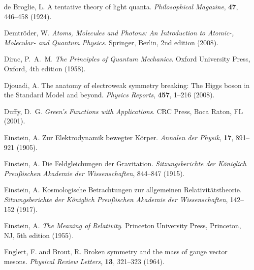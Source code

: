 \documentclass[12pt,a4paper]{article}
\begin{document}
\begin{thebibliography}{99}
		de Broglie, L.
		\newblock A tentative theory of light quanta.
		\newblock \textit{Philosophical Magazine}, \textbf{47}, 446--458 (1924).
		\newblock {}
		
		Demtröder, W.
		\newblock \textit{Atoms, Molecules and Photons: An Introduction to Atomic-, Molecular- and Quantum Physics}.
		\newblock Springer, Berlin, 2nd edition (2008).
		
		Dirac, P.~A.~M.
		\newblock \textit{The Principles of Quantum Mechanics}.
		\newblock Oxford University Press, Oxford, 4th edition (1958).
		
		Djouadi, A.
		\newblock The anatomy of electroweak symmetry breaking: The Higgs boson in the Standard Model and beyond.
		\newblock \textit{Physics Reports}, \textbf{457}, 1--216 (2008).
		\newblock {}
		
		Duffy, D.~G.
		\newblock \textit{Green's Functions with Applications}.
		\newblock CRC Press, Boca Raton, FL (2001).
		
		Einstein, A.
		\newblock Zur Elektrodynamik bewegter Körper.
		\newblock \textit{Annalen der Physik}, \textbf{17}, 891--921 (1905).
		\newblock {}
		
		Einstein, A.
		\newblock Die Feldgleichungen der Gravitation.
		\newblock \textit{Sitzungsberichte der Königlich Preußischen Akademie der Wissenschaften}, 844--847 (1915).
		
		Einstein, A.
		\newblock Kosmologische Betrachtungen zur allgemeinen Relativitätstheorie.
		\newblock \textit{Sitzungsberichte der Königlich Preußischen Akademie der Wissenschaften}, 142--152 (1917).
		
		Einstein, A.
		\newblock \textit{The Meaning of Relativity}.
		\newblock Princeton University Press, Princeton, NJ, 5th edition (1955).
		
		Englert, F. and Brout, R.
		\newblock Broken symmetry and the mass of gauge vector mesons.
		\newblock \textit{Physical Review Letters}, \textbf{13}, 321--323 (1964).
		\newblock {}
		

\end{thebibliography}
\end{document}
